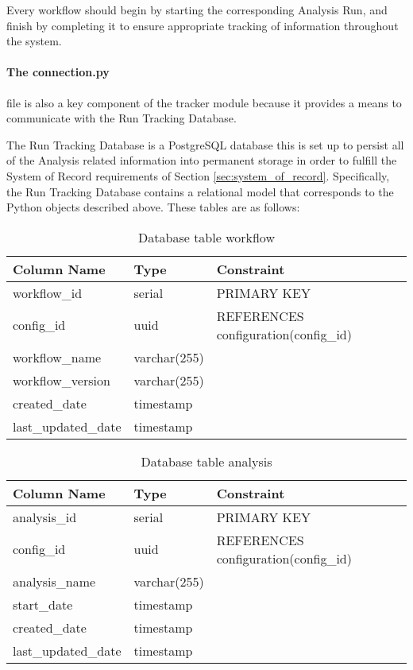 Every workflow should begin by starting the corresponding Analysis Run, and finish by completing it to ensure appropriate tracking of information throughout the system.

\paragraph{The connection.py} file is also a key component of the tracker module because it provides a means to communicate with the Run Tracking Database.

The Run Tracking Database is a PostgreSQL database this is set up to persist all of the Analysis related information into permanent storage in order to fulfill the System of Record requirements of Section \ref{sec:system_of_record}. Specifically, the Run Tracking Database contains a relational model that corresponds to the Python objects described above. These tables are as follows:

\begin{table}[H]
\renewcommand{\arraystretch}{1.2} 
\centering
\begin{tabular}{@{}lll@{}}
\toprule
Column Name & Type & Constraint\\
\midrule
workflow\_id & serial & PRIMARY KEY\\
config\_id & uuid & REFERENCES configuration(config\_id)\\
workflow\_name & varchar(255) & \\
workflow\_version & varchar(255) & \\
created\_date & timestamp\\
last\_updated\_date & timestamp\\
\bottomrule
\end{tabular}
\caption{Database table workflow}
\end{table}

\begin{table}[H]
\renewcommand{\arraystretch}{1.2} 
\centering
\begin{tabular}{@{}lll@{}}
\toprule
Column Name & Type & Constraint\\
\midrule
analysis\_id & serial & PRIMARY KEY\\
config\_id & uuid & REFERENCES configuration(config\_id)\\
analysis\_name & varchar(255) & \\
start\_date & timestamp & \\
created\_date & timestamp\\
last\_updated\_date & timestamp\\
\bottomrule
\end{tabular}
\caption{Database table analysis}
\end{table}

